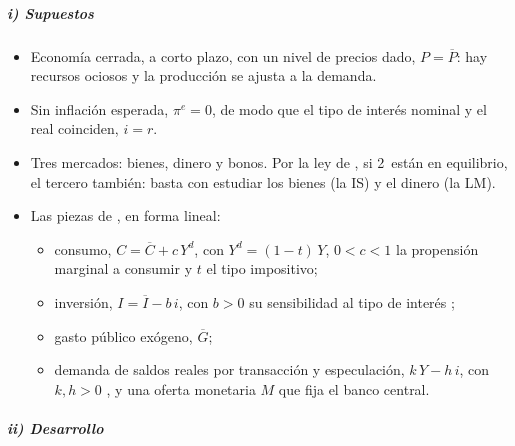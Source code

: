 \documentclass[11pt]{article}
\begin{document}
\subparagraph{i) Supuestos}

\begin{itemize}
\item Economía cerrada, a corto plazo, con un nivel de precios dado, $P=\overline{P}$: hay recursos ociosos y la producción se ajusta a la demanda.
\item Sin inflación esperada, $\pi^e=0$, de modo que el tipo de interés nominal y el real coinciden, $i=r$.
\item Tres mercados: bienes, dinero y bonos. Por la ley de , si 2~están en equilibrio, el tercero también: basta con estudiar los bienes (la IS) y el dinero (la LM).
\item Las piezas de , en forma lineal:
  \begin{itemize}
  \item consumo, $C=\overline{C}+c\,Y^d$, con $Y^d=(1-t)\,Y$, $0<c<1$ la propensión marginal a consumir y $t$ el tipo impositivo;
  \item inversión, $I=\overline{I}-b\,i$, con $b>0$ su sensibilidad al tipo de interés ;
  \item gasto público exógeno, $\overline{G}$;
  \item demanda de saldos reales por transacción y especulación, $k\,Y-h\,i$, con $k,h>0$ , y una oferta monetaria $M$ que fija el banco central.
  \end{itemize}
\end{itemize}

\subparagraph{ii) Desarrollo}
\end{document}
